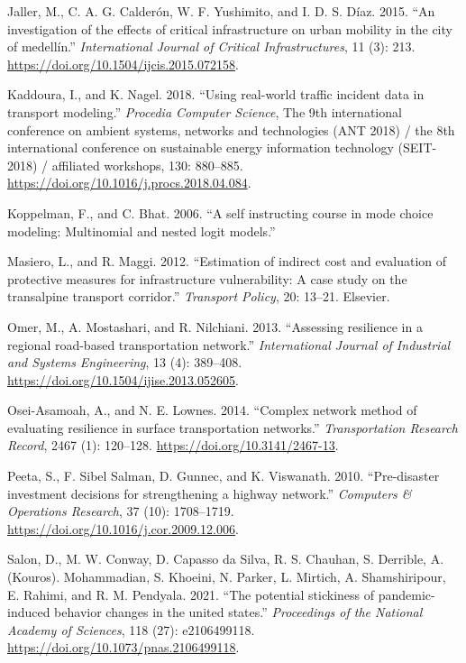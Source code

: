 \documentclass[]{ascelike-new}
\newlength{\cslhangindent}
\newlength{\cslentryspacingunit} %
\newenvironment{CSLReferences}[2] %
 {%
  \setlength{\parindent}{0pt}
  \ifodd #1
  \let\oldpar\par
  \def\par{\hangindent=\cslhangindent\oldpar}
  \fi
  \setlength{\parskip}{#2\cslentryspacingunit}
 }%
 {}
\begin{document}
\begin{CSLReferences}{1}{0}
\leavevmode{}%
Jaller, M., C. A. G. Calderón, W. F. Yushimito, and I. D. S. Díaz. 2015.
{``An investigation of the effects of critical infrastructure on urban
mobility in the city of medellín.''} \emph{International Journal of
Critical Infrastructures}, 11 (3): 213.
\url{https://doi.org/10.1504/ijcis.2015.072158}.

\leavevmode{}%
Kaddoura, I., and K. Nagel. 2018. {``Using real-world traffic incident
data in transport modeling.''} \emph{Procedia Computer Science}, The 9th
international conference on ambient systems, networks and technologies
({ANT} 2018) / the 8th international conference on sustainable energy
information technology ({SEIT-2018}) / affiliated workshops, 130:
880--885. \url{https://doi.org/10.1016/j.procs.2018.04.084}.

\leavevmode{}%
Koppelman, F., and C. Bhat. 2006. {``A self instructing course in mode
choice modeling: Multinomial and nested logit models.''}

\leavevmode{}%
Masiero, L., and R. Maggi. 2012. {``Estimation of indirect cost and
evaluation of protective measures for infrastructure vulnerability: A
case study on the transalpine transport corridor.''} \emph{Transport
Policy}, 20: 13--21. Elsevier.

\leavevmode{}%
Omer, M., A. Mostashari, and R. Nilchiani. 2013. {``Assessing resilience
in a regional road-based transportation network.''} \emph{International
Journal of Industrial and Systems Engineering}, 13 (4): 389--408.
\url{https://doi.org/10.1504/ijise.2013.052605}.

\leavevmode{}%
Osei-Asamoah, A., and N. E. Lownes. 2014. {``Complex network method of
evaluating resilience in surface transportation networks.''}
\emph{Transportation Research Record}, 2467 (1): 120--128.
\url{https://doi.org/10.3141/2467-13}.

\leavevmode{}%
Peeta, S., F. Sibel Salman, D. Gunnec, and K. Viswanath. 2010.
{``Pre-disaster investment decisions for strengthening a highway
network.''} \emph{Computers \& Operations Research}, 37 (10):
1708--1719. \url{https://doi.org/10.1016/j.cor.2009.12.006}.

\leavevmode{}%
Salon, D., M. W. Conway, D. Capasso da Silva, R. S. Chauhan, S.
Derrible, A. (Kouros). Mohammadian, S. Khoeini, N. Parker, L. Mirtich,
A. Shamshiripour, E. Rahimi, and R. M. Pendyala. 2021. {``The potential
stickiness of pandemic-induced behavior changes in the united states.''}
\emph{Proceedings of the National Academy of Sciences}, 118 (27):
e2106499118. \url{https://doi.org/10.1073/pnas.2106499118}.


\end{CSLReferences}
\end{document}
